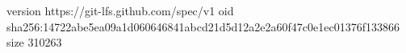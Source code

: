version https://git-lfs.github.com/spec/v1
oid sha256:14722abe5ea09a1d060646841abcd21d5d12a2e2a60f47c0e1ec01376f133866
size 310263
